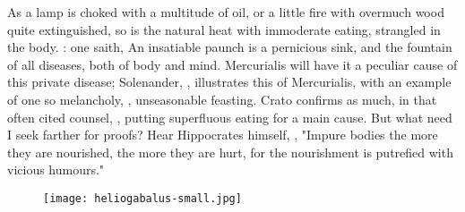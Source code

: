 As a lamp is choked with a multitude of oil, or a little fire with overmuch
wood quite extinguished, so is the natural heat with immoderate eating,
strangled in the body. : one
saith, An insatiable paunch is a pernicious sink, and the fountain of all
diseases, both of body and mind. Mercurialis will have it
a peculiar cause of this private disease; Solenander,
, illustrates this of Mercurialis,
with an example of one so melancholy, ,
unseasonable feasting. Crato confirms as much, in that
often cited counsel, , putting superfluous
eating for a main cause. But what need I seek farther for proofs? Hear
Hippocrates himself, , "Impure bodies the more they are nourished, the more they are hurt, for
the nourishment is putrefied with vicious humours."

\begin{figure}[H]
  \begingroup
  \centering
  \texttt{[image: heliogabalus-small.jpg]}
  \label{fig:heliogabalus}
\end{figure}


